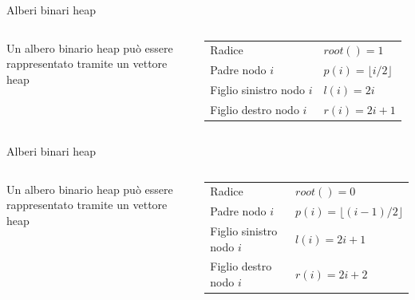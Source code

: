 \begin{frame}{Alberi binari heap}

\vspace{-6pt}
\small
\begin{columns}[T]
Un albero binario heap può essere rappresentato tramite un \alert{vettore heap} 

  \medskip
  \begingroup
  \renewcommand*{\arraystretch}{1.2}
  \begin{tabular}{ll}
    \alert{Radice} & $root() = 1$\\
    \alert{Padre nodo $i$} & $p(i) = \lfloor i/2 \rfloor$\\
    \alert{Figlio sinistro nodo $i$} & $l(i) = 2i$\\
    \alert{Figlio destro nodo $i$} & $r(i) = 2i+1$\\
  \end{tabular}
  \endgroup
{}
\vspace{-12pt}
\end{columns}


\end{frame}

\begin{frame}{Alberi binari heap}

\vspace{-6pt}
\small
\begin{columns}[T]
Un albero binario heap può essere rappresentato tramite un \alert{vettore heap} 

  \medskip
  \begingroup
  \renewcommand*{\arraystretch}{1.2}
  \begin{tabular}{ll}
    \alert{Radice} & $root() = 0$\\
    \alert{Padre nodo $i$} & $p(i) = \lfloor (i-1)/2 \rfloor$\\
    \alert{Figlio sinistro nodo $i$} & $l(i) = 2i+1$\\
    \alert{Figlio destro nodo $i$} & $r(i) = 2i+2$\\
  \end{tabular}
  \endgroup
{}
\vspace{-12pt}
\end{columns}


\end{frame}

